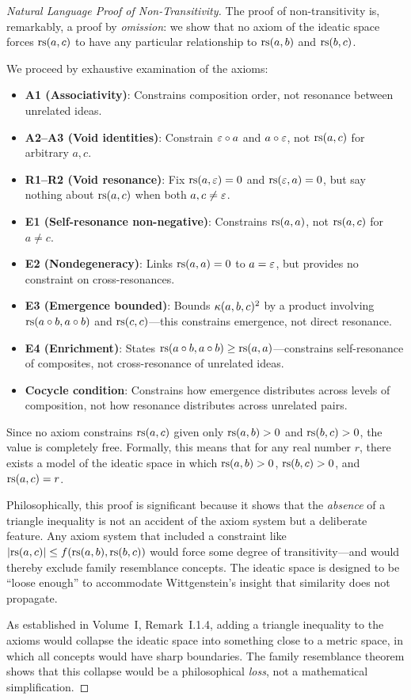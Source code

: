 \begin{proof}[Natural Language Proof of Non-Transitivity]
The proof of non-transitivity is, remarkably, a proof by \emph{omission}:
we show that no axiom of the ideatic space forces $\mathrm{rs}(a, c)$ to have any
particular relationship to $\mathrm{rs}(a, b)$ and $\mathrm{rs}(b, c)$.

We proceed by exhaustive examination of the axioms:
\begin{itemize}
\item \textbf{A1 (Associativity)}: Constrains composition order, not resonance
between unrelated ideas.
\item \textbf{A2--A3 (Void identities)}: Constrain $\varepsilon \circ a$ and
$a \circ \varepsilon$, not $\mathrm{rs}(a, c)$ for arbitrary $a, c$.
\item \textbf{R1--R2 (Void resonance)}: Fix $\mathrm{rs}(a, \varepsilon) = 0$ and
$\mathrm{rs}(\varepsilon, a) = 0$, but say nothing about $\mathrm{rs}(a, c)$ when both $a, c \neq \varepsilon$.
\item \textbf{E1 (Self-resonance non-negative)}: Constrains $\mathrm{rs}(a, a)$, not
$\mathrm{rs}(a, c)$ for $a \neq c$.
\item \textbf{E2 (Nondegeneracy)}: Links $\mathrm{rs}(a, a) = 0$ to $a = \varepsilon$, but
provides no constraint on cross-resonances.
\item \textbf{E3 (Emergence bounded)}: Bounds $\kappa(a, b, c)^2$ by a product
involving $\mathrm{rs}(a \circ b, a \circ b)$ and $\mathrm{rs}(c, c)$---this constrains
emergence, not direct resonance.
\item \textbf{E4 (Enrichment)}: States $\mathrm{rs}(a \circ b, a \circ b)
\geq \mathrm{rs}(a, a)$---constrains self-resonance of composites, not cross-resonance
of unrelated ideas.
\item \textbf{Cocycle condition}: Constrains how emergence distributes across
levels of composition, not how resonance distributes across unrelated pairs.
\end{itemize}

Since no axiom constrains $\mathrm{rs}(a, c)$ given only $\mathrm{rs}(a, b) > 0$ and
$\mathrm{rs}(b, c) > 0$, the value is completely free. Formally, this means that for
any real number $r$, there exists a model of the ideatic space in which
$\mathrm{rs}(a, b) > 0$, $\mathrm{rs}(b, c) > 0$, and $\mathrm{rs}(a, c) = r$.

Philosophically, this proof is significant because it shows that the
\emph{absence} of a triangle inequality is not an accident of the axiom system
but a deliberate feature. Any axiom system that included a constraint like
$|\mathrm{rs}(a, c)| \leq f(\mathrm{rs}(a, b), \mathrm{rs}(b, c))$ would force some degree of
transitivity---and would thereby exclude family resemblance concepts. The
ideatic space is designed to be ``loose enough'' to accommodate Wittgenstein's
insight that similarity does not propagate.

As established in Volume~I, Remark~I.1.4, adding a triangle inequality to the
axioms would collapse the ideatic space into something close to a metric space,
in which all concepts would have sharp boundaries. The family resemblance
theorem shows that this collapse would be a philosophical \emph{loss}, not a
mathematical simplification.
\end{proof}

